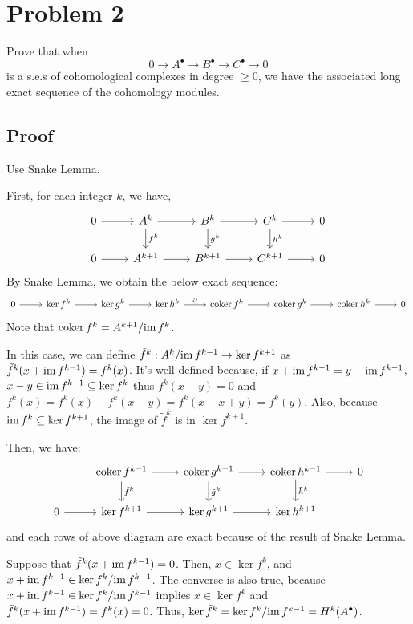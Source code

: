 \section*{Problem 2}

Prove that when
\[0 \to A^\bullet \to B^\bullet \to C^\bullet \to 0\]
is a s.e.s of cohomological complexes in degree \(\ge 0\),
we have the associated long exact sequence of the cohomology modules.

\subsection*{Proof}

Use Snake Lemma.

First, for each integer \(k\), we have,
\[\begin{tikzcd}
  0 \ar{r} & A^k \ar["f^k"]{d} \ar{r} & B^k \ar["g^k"]{d} \ar{r} & C^k \ar["h^k"]{d} \ar{r} & 0 \\
  0 \ar{r} & A^{k+1} \ar{r} & B^{k+1} \ar{r} & C^{k+1} \ar{r} & 0
  \end{tikzcd}\]
By Snake Lemma, we obtain the below exact sequence:
\[\begin{tikzcd}
  0 \ar{r}
  & \ker f^k \ar{r}
  & \ker g^k \ar{r}
  & \ker h^k \ar["\partial"]{r}
  & \coker f^k \ar{r}
  & \coker g^k \ar{r}
  & \coker h^k \ar{r}
  & 0
  \end{tikzcd}\]
Note that \(\textnormal{coker}\, f^k = A^{k + 1} / \textnormal{im}\, f^k\).

In this case, we can define
\(\tilde f^k: A^k / \textnormal{im}\, f^{k - 1} \to \ker f^{k + 1}\)
as
\(\tilde f^k(x + \textnormal{im}\, f^{k-1}) = f^k(x)\).
It's well-defined because,
if \(x + \textnormal{im}\, f^{k-1} = y + \textnormal{im}\, f^{k-1}\),
\(x - y \in \textnormal{im}\, f^{k-1} \subseteq \ker f^k\)
thus \(f^k(x - y) = 0\)
and \(f^k(x) = f^k(x) - f^k(x - y) = f^k(x - x + y) = f^k(y)\).
Also, because \(\textnormal{im}\, f^k \subseteq \ker f^{k + 1}\), the image of \(\tilde f^k\) is in \(\ker f^{k+1}\).

Then, we have:
\[\begin{tikzcd}
  & \coker f^{k-1} \ar["\tilde f^k"]{d} \ar{r} & \coker g^{k-1} \ar["\tilde g^k"]{d} \ar{r} & \coker h^{k-1} \ar["\tilde h^k"]{d} \ar{r} & 0 \\
  0 \ar{r} & \ker f^{k + 1} \ar{r} & \ker g^{k + 1} \ar{r} & \ker h^{k + 1} &
  \end{tikzcd}\]
and each rows of above diagram are exact because of the result of Snake Lemma.

Suppose that \(\tilde f^k(x + \textnormal{im}\, f^{k-1}) = 0\).
Then, \(x \in \ker f^k\), and \(x + \textnormal{im}\, f^{k-1} \in \ker f^k / \textnormal{im}\, f^{k-1}\).
The converse is also true,
because \(x + \textnormal{im}\, f^{k-1} \in \ker f^k / \textnormal{im}\, f^{k-1}\)
implies \(x \in \ker f^k\) and \(\tilde f^k(x + \textnormal{im}\, f^{k-1}) = f^k(x) = 0\).
Thus, \(\ker \tilde f^k = \ker f^k / \textnormal{im}\, f^{k - 1} = H^k(A^\bullet)\).

